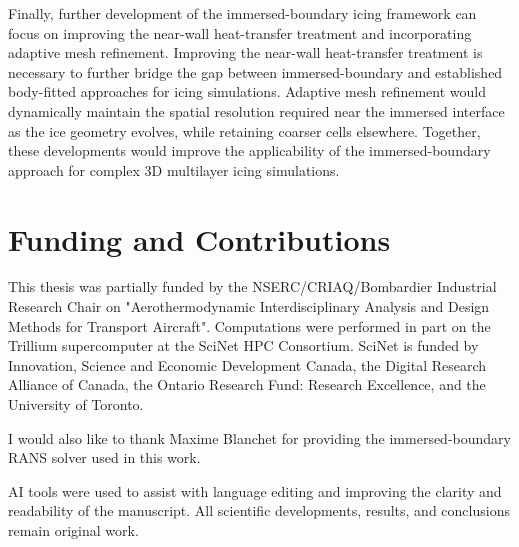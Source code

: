 Finally, further development of the immersed-boundary icing framework can focus on improving the near-wall heat-transfer treatment and incorporating adaptive mesh refinement. Improving the near-wall heat-transfer treatment is necessary to further bridge the gap between immersed-boundary and established body-fitted approaches for icing simulations. Adaptive mesh refinement would dynamically maintain the spatial resolution required near the immersed interface as the ice geometry evolves, while retaining coarser cells elsewhere. Together, these developments would improve the applicability of the immersed-boundary approach for complex 3D multilayer icing simulations.


\newpage

\section*{Funding and Contributions}
This thesis was partially funded by the NSERC/CRIAQ/Bombardier Industrial Research Chair on "Aerothermodynamic Interdisciplinary Analysis and Design Methods for Transport Aircraft". Computations were performed in part on the Trillium supercomputer at the SciNet HPC Consortium. SciNet is funded by Innovation, Science and Economic Development Canada, the Digital Research Alliance of Canada, the Ontario Research Fund: Research Excellence, and the University of Toronto.

I would also like to thank Maxime Blanchet for providing the immersed-boundary RANS solver used in this work.

AI tools were used to assist with language editing and improving the clarity and readability of the manuscript. All scientific developments, results, and conclusions remain original work.